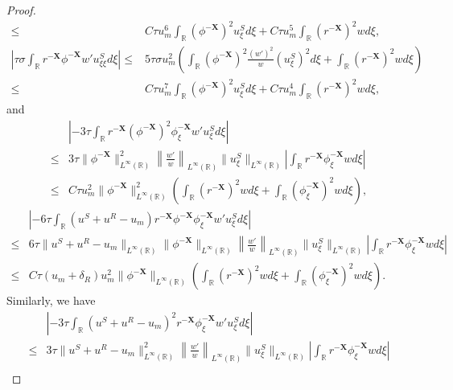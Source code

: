 \documentclass[10pt,a4paper]{amsart}
\begin{document}
\begin{proof}
\begin{align*}
			\leq&C\tau u_m^6\int_{\mathbb{R}}(\phi^{-\mathbf{X}})^2u_{\xi}^Sd\xi+C\tau u_m^5\int_{\mathbb{R}}(r^{-\mathbf{X}})^2wd\xi,\\
			\left|\tau\sigma\int_{\mathbb{R}}r^{-\mathbf{X}}\phi^{-\mathbf{X}}w'u^S_{\xi\xi}d\xi\right|\leq&5\tau\sigma u_m^2\left(\int_{\mathbb{R}}(\phi^{-\mathbf{X}})^2\frac{(w')^2}{w}(u^S_{\xi})^2d\xi+\int_{\mathbb{R}}(r^{-\mathbf{X}})^2wd\xi\right)\\
			\leq&C\tau u_m^7\int_{\mathbb{R}}(\phi^{-\mathbf{X}})^2u^S_{\xi}d\xi+C\tau u_m^4\int_{\mathbb{R}}(r^{-\mathbf{X}})^2wd\xi,
		\end{align*}
		and
		\begin{align*}
			&\left|-3\tau\int_{\mathbb{R}}r^{-\mathbf{X}}(\phi^{-\mathbf{X}})^{2}\phi_{\xi}^{-\mathbf{X}}w'u_{\xi}^{S}d\xi\right|\\
			\leq&3\tau\lVert\phi^{-\mathbf{X}}\rVert_{L^{\infty}(\mathbb{R})}^2\left\lVert\frac{w'}{w}\right\rVert_{L^{\infty}(\mathbb{R})}\|u_{\xi}^S\|_{L^{\infty}(\mathbb{R})}\left|\int_{\mathbb{R}}r^{-\mathbf{X}}\phi_{\xi}^{-\mathbf{X}}wd\xi\right|\\
			\leq&C\tau u_m^2\lVert\phi^{-\mathbf{X}}\rVert_{L^{\infty}(\mathbb{R})}^2\left(\int_{\mathbb{R}}(r^{-\mathbf{X}})^2wd\xi+\int_{\mathbb{R}}(\phi_{\xi}^{-\mathbf{X}})^2wd\xi\right),
			\end{align*}
			\begin{align*}
			&\left|-6\tau\int_{\mathbb{R}}(u^{S}+u^{R}-u_{m})r^{-\mathbf{X}}\phi^{-\mathbf{X}}\phi_{\xi}^{-\mathbf{X}}w'u_{\xi}^{S}d\xi\right|\\
			\leq&6\tau\lVert u^S+u^R-u_m\rVert_{L^{\infty}(\mathbb{R})}\lVert\phi^{-\mathbf{X}}\rVert_{L^{\infty}(\mathbb{R})}\left\lVert\frac{w'}{w}\right\rVert_{L^{\infty}(\mathbb{R})}\|u_{\xi}^S\|_{L^{\infty}(\mathbb{R})}\left|\int_{\mathbb{R}}r^{-\mathbf{X}}\phi_{\xi}^{-\mathbf{X}}wd\xi\right|\\
			\leq&C\tau(u_m+\delta_R)u_m^2\lVert\phi^{-\mathbf{X}}\rVert_{L^{\infty}(\mathbb{R})}\left(\int_{\mathbb{R}}(r^{-\mathbf{X}})^2wd\xi+\int_{\mathbb{R}}(\phi_{\xi}^{-\mathbf{X}})^2wd\xi\right).
		\end{align*}
		Similarly, we have
		\begin{align*}
			&\left|-3\tau\int_{\mathbb{R}}(u^{S}+u^{R}-u_{m})^{2}r^{-\mathbf{X}}\phi_{\xi}^{-\mathbf{X}}w'u_{\xi}^{S}d\xi\right|\\
			\leq&3\tau\lVert u^S+u^R-u_m\rVert_{L^{\infty}(\mathbb{R})}^2\left\lVert\frac{w'}{w}\right\rVert_{L^{\infty}(\mathbb{R})}\|u_{\xi}^S\|_{L^{\infty}(\mathbb{R})}\left|\int_{\mathbb{R}}r^{-\mathbf{X}}\phi_{\xi}^{-\mathbf{X}}wd\xi\right|\\

\end{align*}
\end{proof}
\end{document}
